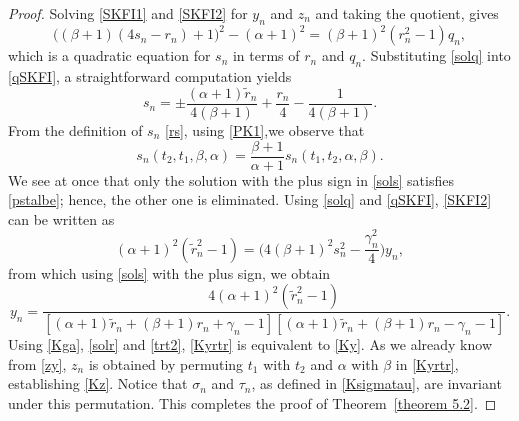 \documentclass[10pt, reqno]{amsart}
\numberwithin{equation}{section}
\numberwithin{equation}{section}
\begin{document}
\begin{proof}
Solving \eqref{SKFI1} and \eqref{SKFI2} for $y_n$ and $z_n$ and taking the quotient, gives 
\begin{equation} \label{qSKFI}
\big((\beta+1)(4s_n-r_n)+1\big)^2-(\alpha+1)^2=(\beta+1)^2(r_n^2-1)q_n,
\end{equation}
which is a quadratic equation for $s_n$ in terms of $r_n$ and $q_n$. Substituting \eqref{solq} into \eqref{qSKFI}, a straightforward computation yields
\begin{equation} 
s_n=\pm \frac{(\alpha+1)\tilde{r}_n}{4(\beta+1)} +\frac{r_n}{4}-\frac{1}{4(\beta+1)}.\label{sols}
\end{equation}
From the definition of $s_n$ \eqref{rs}, using \eqref{PK1},we observe that
\begin{equation}
s_n(t_2,t_1,\beta,\alpha)=\frac{\beta+1}{\alpha+1} s_n(t_1,t_2,\alpha,\beta).\label{pstalbe} 
\end{equation}
We see at once that only the solution with the plus sign in \eqref{sols} satisfies \eqref{pstalbe}; hence, the other one is eliminated. Using \eqref{solq} and \eqref{qSKFI}, \eqref{SKFI2} can be written as
\begin{equation*}
(\alpha+1)^2(\tilde{r}_n^2-1)=\Big(4(\beta+1)^2s_n^2-\frac{\gamma_n^2}{4}\Big)y_n,
\end{equation*}
from which using \eqref{sols} with the plus sign, we obtain 
\begin{equation}
y_n=\frac{4(\alpha+1)^2(\tilde{r}_n^2-1)}{[(\alpha+1)\tilde{r}_n+(\beta+1)r_n+\gamma_n-1][(\alpha+1)\tilde{r}_n+(\beta+1)r_n-\gamma_n-1]}.\label{Kyrtr}
\end{equation}
Using \eqref{Kga}, \eqref{solr} and \eqref{trt2}, \eqref{Kyrtr} is equivalent to \eqref{Ky}. As we already know from \eqref{zy}, $z_n$ is obtained by permuting $t_1$ with $t_2$ and $\alpha$ with $\beta$ in \eqref{Kyrtr}, establishing \eqref{Kz}. Notice that $\sigma_n$ and $\tau_n$, as defined in \eqref{Ksigmatau}, are invariant under this permutation. This completes the proof of Theorem~\ref{theorem 5.2}.
\end{proof}
\end{document}
